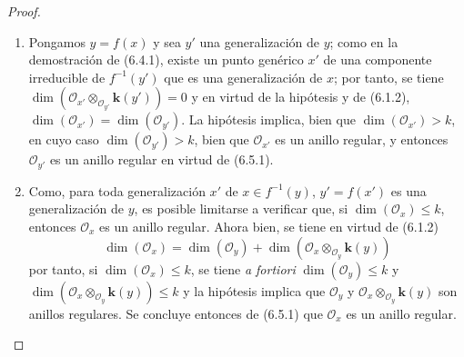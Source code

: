 \begin{proof}
\medskip\noindent
\begin{enumerate}
\item[(i)] Pongamos $y=f(x)$ y sea $y'$ una generalización de $y$; como
en la demostración de (6.4.1), existe un punto genérico $x'$ de una
componente irreducible de $f^{-1}(y')$ que es una generalización de $x$;
por tanto, se tiene
$\dim(\mathcal O_{x'}\otimes_{\mathcal O_{y'}}\boldsymbol{k}(y'))=0$
y en virtud de la hipótesis y de (6.1.2),
$\dim(\mathcal O_{x'})=\dim(\mathcal O_{y'})$.
La hipótesis implica, bien que
$\dim(\mathcal O_{x'})>k$, en cuyo caso
$\dim(\mathcal O_{y'})>k$, bien que $\mathcal O_{x'}$ es un anillo
regular, y entonces $\mathcal O_{y'}$ es un anillo regular en virtud de
(6.5.1).

\item[(ii)] Como, para toda generalización $x'$ de $x\in f^{-1}(y)$,
$y'=f(x')$ es una generalización de $y$, es posible limitarse a verificar que,
si $\dim(\mathcal O_x)\leqslant k$, entonces $\mathcal O_x$ es un anillo
regular. Ahora bien, se tiene en virtud de (6.1.2)
\[
\dim(\mathcal O_x)=\dim(\mathcal O_y)
+\dim(\mathcal O_x\otimes_{\mathcal O_y}\boldsymbol{k}(y))
\]
por tanto, si $\dim(\mathcal O_x)\leqslant k$, se tiene \emph{a fortiori}
$\dim(\mathcal O_y)\leqslant k$ y
$\dim(\mathcal O_x\otimes_{\mathcal O_y}\boldsymbol{k}(y))\leqslant k$ y la hipótesis
implica que $\mathcal O_y$ y
$\mathcal O_x\otimes_{\mathcal O_y}\boldsymbol{k}(y)$ son anillos regulares. Se concluye
entonces de (6.5.1) que $\mathcal O_x$ es un anillo regular.
\end{enumerate}
\end{proof}
